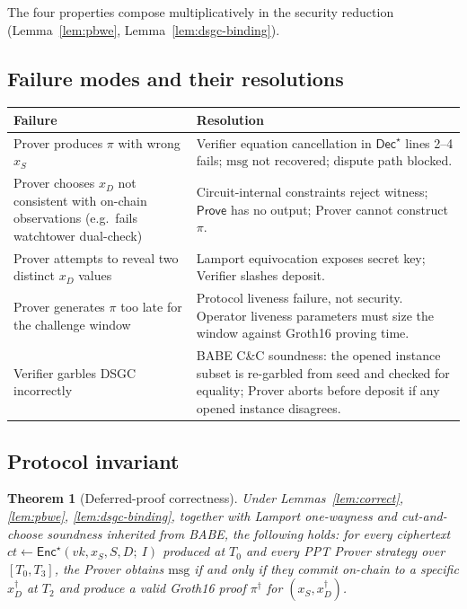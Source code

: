 \documentclass[11pt]{article}
\newtheorem{theorem}{Theorem}
\newcommand{\msg}{\mathrm{msg}}
\newcommand{\Enc}{\mathsf{Enc}}
\newcommand{\Dec}{\mathsf{Dec}}
\begin{document}
The four properties compose multiplicatively in the security
reduction (Lemma~\ref{lem:pbwe}, Lemma~\ref{lem:dsgc-binding}).

\subsection{Failure modes and their resolutions}

\begin{center}\small
\renewcommand{\arraystretch}{1.25}
\begin{tabular}{@{}p{5.5cm} p{6.5cm}@{}}
\toprule
\textbf{Failure} & \textbf{Resolution} \\
\midrule
Prover produces $\pi$ with wrong $x_S$ & Verifier equation
cancellation in $\Dec^\star$ lines 2--4 fails; $\msg$ not recovered;
dispute path blocked. \\
Prover chooses $x_D$ not consistent with on-chain observations
(e.g.\ fails watchtower dual-check) & Circuit-internal constraints
reject witness; $\mathsf{Prove}$ has no output; Prover cannot
construct $\pi$. \\
Prover attempts to reveal two distinct $x_D$ values & Lamport
equivocation exposes secret key; Verifier slashes deposit. \\
Prover generates $\pi$ too late for the challenge window & Protocol
liveness failure, not security. Operator liveness parameters must
size the window against Groth16 proving time. \\
Verifier garbles DSGC incorrectly & BABE C\&C soundness: the opened
instance subset is re-garbled from seed and checked for equality;
Prover aborts before deposit if any opened instance disagrees. \\
\bottomrule
\end{tabular}
\end{center}

\subsection{Protocol invariant}

\begin{theorem}[Deferred-proof correctness]\label{thm:deferred}
Under Lemmas~\ref{lem:correct}, \ref{lem:pbwe},
\ref{lem:dsgc-binding}, together with Lamport one-wayness and
cut-and-choose soundness inherited from BABE, the following holds:
for every ciphertext $ct \gets \Enc^\star(vk, x_S, S, D;\ I)$
produced at $T_0$ and every PPT Prover strategy over $[T_0, T_3]$,
the Prover obtains $\msg$ if and only if they commit on-chain to a
specific $x_D^\dagger$ at $T_2$ and produce a valid Groth16 proof
$\pi^\dagger$ for $(x_S, x_D^\dagger)$.
\end{theorem}
\end{document}

